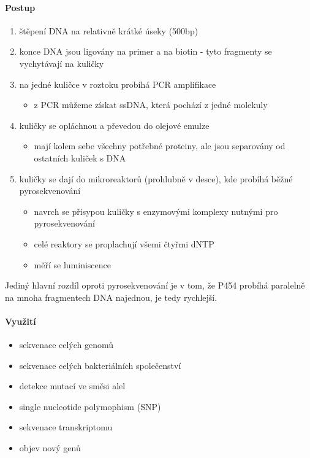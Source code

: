 \documentclass[DIV=8]{scrreprt}
\begin{document}
\paragraph{Postup}
\begin{enumerate}[nosep]
    \item štěpení DNA na relativně krátké úseky (500bp)
    \item konce DNA jsou ligovány na primer a na biotin - tyto fragmenty se vychytávají na kuličky
    \item na jedné kuličce v roztoku probíhá PCR amplifikace
\begin{itemize}[nosep]
    \item z PCR můžeme získat ssDNA, která pochází z jedné molekuly
\end{itemize}

    \item kuličky se opláchnou a převedou do olejové emulze
\begin{itemize}[nosep]
    \item mají kolem sebe všechny potřebné proteiny, ale jsou separovány od ostatních kuliček s DNA
\end{itemize}

    \item kuličky se dají do mikroreaktorů (prohlubně v desce), kde probíhá běžné pyrosekvenování
\begin{itemize}[nosep]
    \item navrch se přisypou kuličky s enzymovými komplexy nutnými pro pyrosekvenování
    \item celé reaktory se proplachují všemi čtyřmi dNTP
    \item měří se luminiscence
\end{itemize}

\end{enumerate}



Jediný hlavní rozdíl oproti pyrosekvenování je v tom, že P454 probíhá paralelně na mnoha fragmentech DNA najednou, je tedy rychlejší.

\paragraph{Využití}
\begin{itemize}[nosep]
    \item sekvenace celých genomů
    \item sekvenace celých bakteriálních společenství
    \item detekce mutací ve směsi alel
    \item single nucleotide polymophism (SNP)
    \item sekvenace transkriptomu
    \item objev nový genů
\end{itemize}
\end{document}
